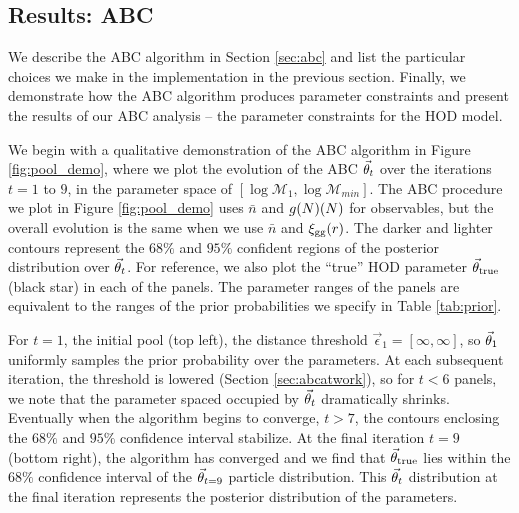 \subsection{Results: ABC}\label{sec:abc_results}
We describe the ABC algorithm in Section \ref{sec:abc} and list the particular choices
we make in the implementation in the previous section. Finally, we demonstrate how the 
ABC algorithm produces parameter constraints and present the results of our ABC analysis -- the 
parameter constraints for the \cite{zheng07} HOD model. 

We begin with a qualitative demonstration of the ABC algorithm in Figure \ref{fig:pool_demo},
where we plot the evolution of the ABC $\vec{\theta}_t$ over the iterations $t = 1$ to $9$, 
in the parameter space of $[\log\mathcal{M}_1, \log\mathcal{M}_{min}]$. The ABC procedure we plot 
in Figure \ref{fig:pool_demo} uses $\bar{n}$ and $g(N)(N)$ for observables, but 
the overall evolution is the same when we use $\bar{n}$ and $\xi_{\mathrm{gg}}(r)$. The darker and lighter 
contours represent the $68\%$ and $95\%$ confident regions of the posterior distribution over $\vec{\theta}_t$. For reference, we also plot the ``true'' HOD parameter $\vec{\theta}_\mathrm{true}$ 
(black star) in each of the panels.
The parameter ranges of the panels are equivalent to the ranges of the prior probabilities we 
specify in Table \ref{tab:prior}. 

For $t=1$, the initial pool (top left), the distance threshold $\vec\epsilon_1 = [\infty , \infty]$, 
so $\vec{\theta}_1$ uniformly samples the prior probability over the parameters.
At each subsequent iteration, the threshold is lowered (Section \ref{sec:abcatwork}), so for 
$t < 6$ panels, we note that the parameter spaced occupied by $\vec{\theta}_t$ dramatically shrinks. 
Eventually when the algorithm begins to converge, $t > 7$, the contours enclosing the $68\%$ and 
$95\%$ confidence interval stabilize. At the final iteration $t=9$ (bottom right), 
the algorithm has converged and we find that 
$\vec{\theta}_\mathrm{true}$ lies within the $68\%$ confidence interval of the $\vec{\theta}_{t=9}$ particle 
distribution. This $\vec{\theta}_t$ distribution at the final iteration represents the 
posterior distribution of the parameters. 

